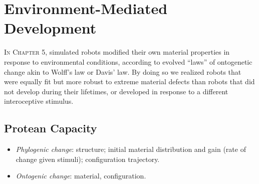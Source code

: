 


\section{Environment-Mediated Development}

\textsc{In Chapter 5,}
simulated robots modified their own material properties
in response to environmental conditions,
according to evolved ``laws'' of ontogenetic change akin to Wolff's law or Davis' law.
By doing so we realized robots that were equally fit but more robust to extreme material defects than robots that did not develop during their lifetimes, or developed in response to a different interoceptive stimulus.


\subsection{Protean Capacity}

\begin{itemize}
    \item \textit{Phylogenic change}: structure; initial material distribution and gain (rate of change given stimuli); configuration trajectory.
    \item \textit{Ontogenic change}: material, configuration.
\end{itemize}


